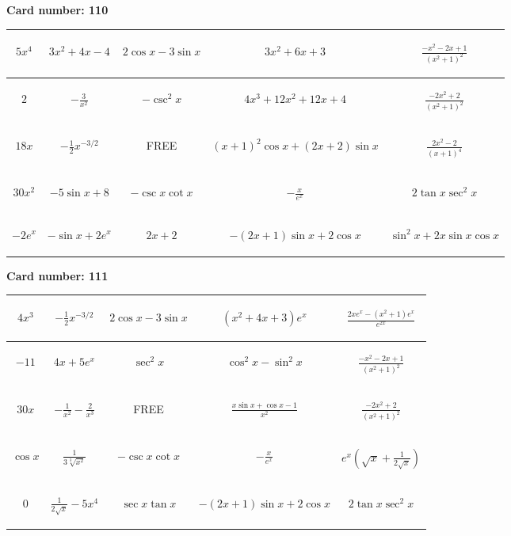 \documentclass{article}
\newcommand{\entry}[1]{\begin{minipage}[t][2.75cm][t]{4cm} \vspace{1cm} \begin{center}#1\end{center} \end{minipage}}
\newcommand{\freespace}{\entry{FREE}}
\newcommand{\cardnumber}[1]{\noindent \textbf{Card number: #1} \bigskip}
\begin{document}
\pagebreak

\cardnumber{110}
\begin{center}
\begin{tabular}{|*{5}{c|}}
    \hline
    \entry{$5x^4$} & \entry{$3x^2 + 4x - 4$} & \entry{$2 \cos x - 3 \sin x$} & \entry{$3x^2 + 6x + 3$} & \entry{$\frac{-x^2 - 2x + 1}{(x^2 + 1)^2}$} \\ \hline
    \entry{$2$} & \entry{$-\frac{3}{x^2}$} & \entry{$-\csc^2 x$} & \entry{$4x^3 + 12x^2 + 12x + 4$} & \entry{$\frac{-2x^2 + 2}{(x^2 + 1)^2}$} \\ \hline
    \entry{$18x$} & \entry{$-\frac{1}{2} x^{-3/2}$} & \freespace & \entry{$(x + 1)^2 \cos x + (2x + 2) \sin x$} & \entry{$\frac{2x^2 - 2}{(x + 1)^4}$} \\ \hline
    \entry{$30x^2$} & \entry{$-5 \sin x + 8$} & \entry{$-\csc x \cot x$} & \entry{$-\frac{x}{e^x}$} & \entry{$2 \tan x \sec^2 x$} \\ \hline
    \entry{$-2e^x$} & \entry{$-\sin x + 2e^x$} & \entry{$2x + 2$} & \entry{$-(2x + 1) \sin x + 2 \cos x$} & \entry{$\sin^2 x + 2x \sin x \cos x$} \\ \hline
\end{tabular}
\end{center}

\pagebreak

\cardnumber{111}
\begin{center}
\begin{tabular}{|*{5}{c|}}
    \hline
    \entry{$4x^3$} & \entry{$-\frac{1}{2} x^{-3/2}$} & \entry{$2 \cos x - 3 \sin x$} & \entry{$(x^2 + 4x + 3) e^x$} & \entry{$\frac{2x e^x - (x^2 + 1) e^x}{e^{2x}}$} \\ \hline
    \entry{$-11$} & \entry{$4x + 5e^x$} & \entry{$\sec^2 x$} & \entry{$\cos^2 x - \sin^2 x$} & \entry{$\frac{-x^2 - 2x + 1}{(x^2 + 1)^2}$} \\ \hline
    \entry{$30x$} & \entry{$-\frac{1}{x^2} - \frac{2}{x^3}$} & \freespace & \entry{$\frac{x \sin x + \cos x - 1}{x^2}$} & \entry{$\frac{-2x^2 + 2}{(x^2 + 1)^2}$} \\ \hline
    \entry{$\cos x$} & \entry{$\frac{1}{3\sqrt[3]{x^2}}$} & \entry{$-\csc x \cot x$} & \entry{$-\frac{x}{e^x}$} & \entry{$e^x \left(\sqrt{x} + \frac{1}{2\sqrt{x}}\right)$} \\ \hline
    \entry{$0$} & \entry{$\frac{1}{2\sqrt{x}} - 5x^4$} & \entry{$\sec x \tan x$} & \entry{$-(2x + 1) \sin x + 2 \cos x$} & \entry{$2 \tan x \sec^2 x$} \\ \hline
\end{tabular}
\end{center}
\end{document}
